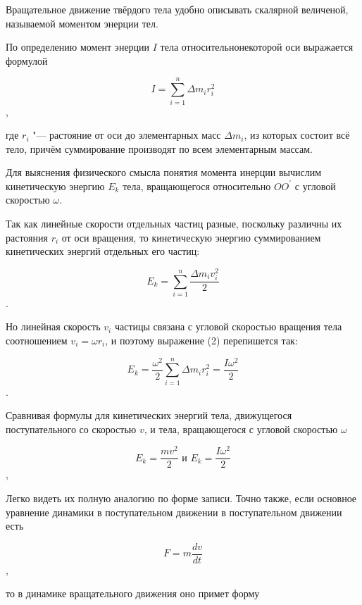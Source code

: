 Вращательное движение твёрдого тела удобно описывать скалярной величеной, называемой моментом энерции тел.

По определению момент энерции $I$ тела относительнонекоторой оси выражается формулой

\begin{equation}
    I = \sum_{i = 1}^{n} \Delta m_i r_i^2  
\end{equation},

где $r_i$ "--- растояние от оси до элементарных масс $\Delta m_i$, из которых состоит всё тело,
причём суммирование производят по всем элементарным массам.

Для выяснения физического смысла понятия момента инерции вычислим кинетическую энергию $E_k$ тела,
вращающегося относительно $OO^{'}$ с угловой скоростью $\omega$.

Так как линейные скорости отдельных частиц разные, поскольку различны их растояния $r_i$ от оси вращения,
то кинетическую энергию суммированием кинетических энергий отдельных его частиц:

\begin{equation}
    E_k = \sum_{i = 1}^{n} \frac{\Delta m_iv_i^2}{2} 
\end{equation}.

Но линейная скорость $v_i$ частицы связана с угловой скоростью вращения тела соотношением $v_i = \omega r_i$,
и поэтому выражение (2) перепишется так:

\begin{equation}
    E_k = \frac{\omega^2}{2} \sum_{i = 1}^{n} \Delta m_ir_i^2 = \frac{I\omega^2}{2}    
\end{equation}.

Сравнивая формулы для кинетических энергий тела,
движущегося поступательного со скоростью $v$, и тела,
вращающегося с угловой скоростью $\omega$

\begin{equation*}
    E_k = \frac{mv^2}{2} 
    \text{ и }
    E_k = \frac{I\omega^2}{2} 
\end{equation*},

Легко видеть их полную аналогию по форме записи.
Точно также, если основное уравнение динамики в поступательном движении в поступательном движении есть

\begin{equation}
    F = m\frac{dv}{dt} 
\end{equation},

то в динамике вращательного движения оно примет форму

